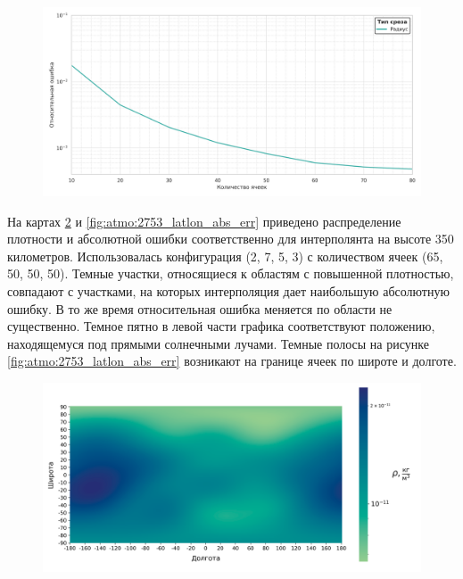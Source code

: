  \begin{figure}[h!]
    \centering
    \includegraphics[width=\linewidth]{../images/solution/atmo/2357_rho.png}
    \label{fig:atmo:2357_rho}
 \end{figure}

 На картах \ref{fig:atmo:2753_latlon} и \ref{fig:atmo:2753_latlon_abs_err} приведено
 распределение плотности и абсолютной ошибки соответственно для интерполянта на высоте 350 километров.
 Использовалась конфигурация (2, 7, 5, 3) с количеством ячеек (65, 50, 50, 50). Темные участки, относящиеся к областям с
 повышенной плотностью, совпадают с участками, на которых интерполяция дает наибольшую абсолютную ошибку.
 В то же время относительная ошибка меняется по области не существенно. Темное пятно в левой
 части графика соответствуют положению, находящемуся под прямыми солнечными лучами.
 Темные полосы на рисунке \ref{fig:atmo:2753_latlon_abs_err} возникают на границе ячеек
 по широте и долготе. 

 \begin{figure}[h!]
    \centering
    \includegraphics[width=\linewidth]{../images/solution/atmo/2753_latlon_direct_val_heatmap.png}
    \label{fig:atmo:2753_latlon}
 \end{figure}

